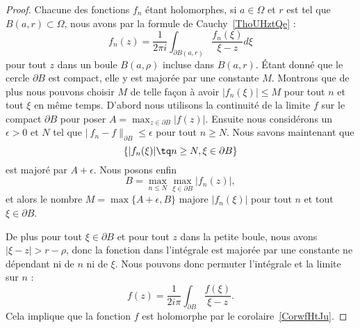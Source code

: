 \begin{proof}
	Chacune des fonctions \( f_n\) étant holomorphes, si \( a\in \Omega\) et \( r\) est tel que \( B(a,r)\subset \Omega\), nous avons par la formule de Cauchy~\ref{ThoUHztQe} :
	\begin{equation}
		f_n(z)=\frac{1}{ 2\pi i }\int_{\partial B(a,r)}\frac{ f_n(\xi) }{ \xi-z }d\xi
	\end{equation}
	pour tout \( z\) dans un boule \( B(a,\rho)\) incluse dans \( B(a,r)\). Étant donné que le cercle \( \partial B\) est compact, elle y est majorée par une constante \( M\). Montrons que de plus nous pouvons choisir \( M\) de telle façon à avoir \( | f_n(\xi) |\leq M\) pour tout \( n\) et tout \( \xi\) en même temps. D'abord nous utilisons la continuité de la limite \( f\) sur le compact \( \partial B \) pour poser \( A=\max_{z\in\partial B}| f(z) |\). Ensuite nous considérons un \( \epsilon>0\) et \( N\) tel que \( |\ f_n-f \|_{\partial B}\leq \epsilon\) pour tout \( n\geq N\). Nous savons maintenant que
	\begin{equation}
		\{ | f_n(\xi) |\tq n \geq N,\xi\in\partial B \}
	\end{equation}
	est majoré par \( A+\epsilon\). Nous posons enfin
	\begin{equation}
		B=\max_{n\leq N}\max_{\xi\in\partial B}| f_n(z) |,
	\end{equation}
	et alors le nombre \( M=\max\{ A+\epsilon,B \}\) majore \( | f_n(\xi) |\) pour tout \( n\) et tout \( \xi\in\partial B\).

	De plus pour tout \( \xi\in\partial B\) et pour tout \( z\) dans la petite boule, nous avons \( | \xi-z |>r-\rho\), donc  la fonction dans l'intégrale est majorée par une constante ne dépendant ni de \( n\) ni de \( \xi\). Nous pouvons donc permuter l'intégrale et la limite sur \( n\) :
	\begin{equation}
		f(z)=\frac{1}{ 2i\pi }\int_{\partial B}\frac{ f(\xi) }{ \xi-z }.
	\end{equation}
	Cela implique que la fonction \( f\) est holomorphe par le corolaire~\ref{CorwfHtJu}.


\end{proof}
